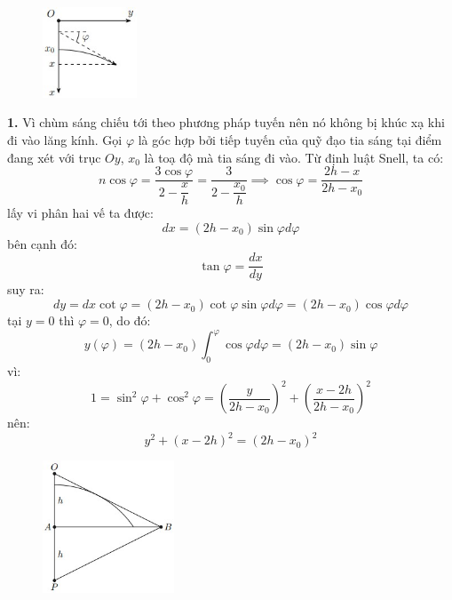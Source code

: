 \vspace{-1cm}
\begin{figure}
  \centering
  \includegraphics[width=0.25\textwidth]{Figures/Fig 5S1.jpg}
\end{figure}

\noindent\textbf{1.} Vì chùm sáng chiếu tới theo phương pháp tuyến nên nó không bị khúc xạ khi đi vào lăng kính. Gọi $\varphi$ là góc hợp bởi tiếp tuyến của quỹ đạo tia sáng tại điểm đang xét với trục $Oy$, $x_{0}$ là toạ độ mà tia sáng đi vào. Từ định luật Snell, ta có:
\begin{equation*}
  n\cos\varphi=\frac{3\cos\varphi}{2-\dfrac{x}{h}}=\frac{3}{2-\dfrac{x_{0}}{h}}\implies\cos\varphi=\frac{2h-x}{2h-x_{0}}
\end{equation*}
lấy vi phân hai vế ta được:
\begin{equation*}
  dx=\left(2h-x_{0}\right)\sin\varphi d\varphi
\end{equation*}
bên cạnh đó:
\begin{equation*}
  \tan\varphi=\frac{dx}{dy}
\end{equation*}
suy ra:
\begin{equation*}
  dy=dx\cot\varphi=(2h-x_{0})\cot\varphi\sin\varphi d\varphi=(2h-x_{0})\cos\varphi d\varphi
\end{equation*}
tại $y=0$ thì $\varphi=0$, do đó:
\begin{equation*}
  y(\varphi)=(2h-x_{0})\int_{0}^{\varphi}\cos\varphi d\varphi=(2h-x_{0})\sin\varphi
\end{equation*}
vì:
\begin{equation*}
  1=\sin^{2}\varphi+\cos^{2}\varphi=\left(\frac{y}{2h-x_{0}}\right)^{2}+\left(\frac{x-2h}{2h-x_{0}}\right)^{2}
\end{equation*}
nên:
\begin{equation*}
  y^{2}+(x-2h)^{2}=(2h-x_{0})^{2}
\end{equation*}

\newpage
\begin{figure}
  \centering
  \includegraphics[width=0.35\textwidth]{Figures/Fig 5S2.jpg}
\end{figure}

